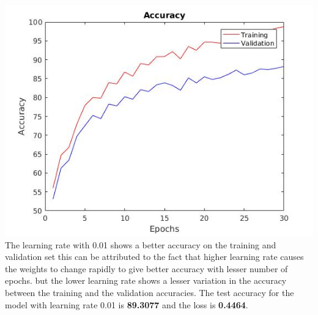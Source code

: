 \documentclass[12pt]{article}
\newenvironment{problem}[2][Problem]{\begin{trivlist}
\item[\hskip \labelsep {\bfseries #1}\hskip \labelsep {\bfseries #2.}]}{\end{trivlist}}
\begin{document}
\begin{problem}{3.1.2}
\includegraphics[scale=0.4]{images/learning_acc_0_01.jpg}   \\

The learning rate with 0.01 shows a better accuracy on the training and validation set this can be attributed to the fact that higher learning rate causes the weights to change rapidly to give better accuracy with lesser number of epochs. but the lower learning rate shows a lesser variation in the accuracy between the training and the validation accuracies. The test accuracy for the model with learning rate 0.01 is {\bf 89.3077} and the loss is {\bf 0.4464}.
\end{problem}


\begin{problem}{2.7}

\end{problem}
\newpage
\begin{problem}{QX}
\end{problem}
\end{document}
